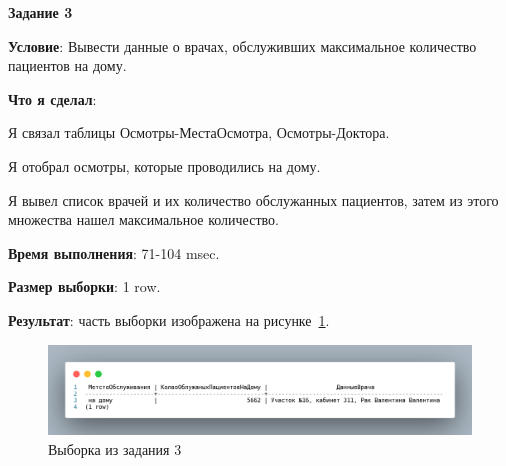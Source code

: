 
\begin{center}
  \textbf{Задание 3}
\end{center}
  
\textbf{Условие}:
Вывести данные о врачах, обслуживших максимальное количество пациентов на дому.
  
\textbf{Что я сделал}:

Я связал таблицы Осмотры-МестаОсмотра, Осмотры-Доктора.

Я отобрал осмотры, которые проводились на дому.

Я вывел список врачей и их количество обслужанных пациентов,
затем из этого множества нашел максимальное количество.



\textbf{Время выполнения}: 71-104 msec.

\textbf{Размер выборки}: 1 row.

\textbf{Результат}: часть выборки изображена на рисунке~\ref{fig:t3}.

\begin{figure}[!h]
  \centering

  \includegraphics[width=16cm]
  {../sql/select/3-out.png}

  \caption{Выборка из задания 3}

  \label{fig:t3}
\end{figure}
















